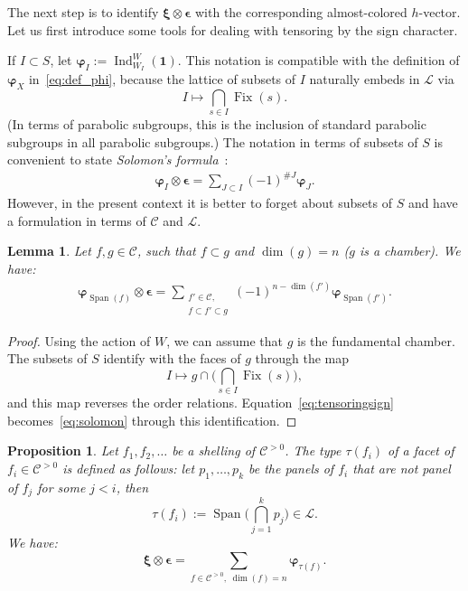 \documentclass[11pt]{article}
\newtheorem{lemm}[theo]{Lemma}
\newtheorem{prop}[theo]{Proposition}
\theoremstyle{definition}
\DeclareMathOperator{\Span}{Span}
\DeclareMathOperator{\Ind}{Ind}
\DeclareMathOperator{\Fix}{Fix}
\newcommand{\bphi}{\boldsymbol{\varphi}}
\newcommand{\bxi}{\boldsymbol{\xi}}
\newcommand{\bepsilon}{\boldsymbol{\epsilon}}
\newcommand{\triv}{\mathbf{1}}
\newcommand{\LL}{\mathcal{L}}
\newcommand{\CC}{\mathcal{C}}
\newcommand{\CCP}{\mathcal{C}^{>0}}
\begin{document}
The next step is to identify $\bxi \otimes \bepsilon$ with the corresponding almost-colored $h$-vector.  Let us first introduce some tools for dealing with tensoring by the sign character.

If $I\subset S$, let $\bphi_I := \Ind_{W_I}^W (\triv)$.  This notation is compatible with the definition of $\bphi_X$ in~\eqref{eq:def_phi}, because the lattice of subsets of $I$ naturally embeds in $\LL$ via
\begin{equation} \label{eq:mapI}
    I \mapsto \bigcap_{s\in I} \Fix(s).
\end{equation}
(In terms of parabolic subgroups, this is the inclusion of standard parabolic subgroups in all parabolic subgroups.)
The notation in terms of subsets of $S$ is convenient to state {\it Solomon's formula}~\cite{solomon}:
\begin{align} \label{eq:solomon}
    \bphi_I \otimes \bepsilon
        =
    \sum_{J\subset I} (-1)^{\#J} \bphi_J.
\end{align}
However, in the present context it is better to forget about subsets of $S$ and have a formulation in terms of $\CC$ and $\LL$.

\begin{lemm} \label{lemm:tensoringsign}
    Let $f,g\in\CC$, such that $f\subset g$ and $\dim(g)=n$ ($g$ is a chamber).  We have:
    \begin{align} \label{eq:tensoringsign}
        \bphi_{\Span(f)} \otimes \bepsilon
            =
        \sum_{\substack{f'\in \CC, \\ f\subset  f' \subset g}} (-1)^{n - \dim(f')} \bphi_{\Span(f')}.
    \end{align}
\end{lemm}

\begin{proof}
    Using the action of $W$, we can assume that $g$ is the fundamental chamber.  The subsets of $S$ identify with the faces of $g$ through the map 
    \[
        I \mapsto g \cap \bigg( \bigcap_{s\in I} \Fix(s) \bigg),
    \]
    and this map reverses the order relations. Equation~\eqref{eq:tensoringsign} becomes~\eqref{eq:solomon} through this identification.
\end{proof}

\begin{prop}\label{theo3}
    Let $f_1,f_2,\dots$ be a shelling of $\CCP$.
    The {\it type} $\tau(f_i)$ of a facet of $f_i \in \CCP$ is defined as follows: let $p_1,\dots,p_k$ be the panels of $f_i$ that are not panel of $f_j$ for some $j<i$, then
    \[
        \tau(f_i) 
            :=
        \Span\Big( \bigcap_{j=1}^k p_j \Big)
            \in \LL.
    \]
    We have: 
    \begin{equation}  \label{eq:xiotimeseps}
        \bxi \otimes \bepsilon  
            =
        \sum_{ f \in \CCP, \; \dim(f)=n }  \bphi_{\tau(f)}.
    \end{equation}
\end{prop}
\end{document}
